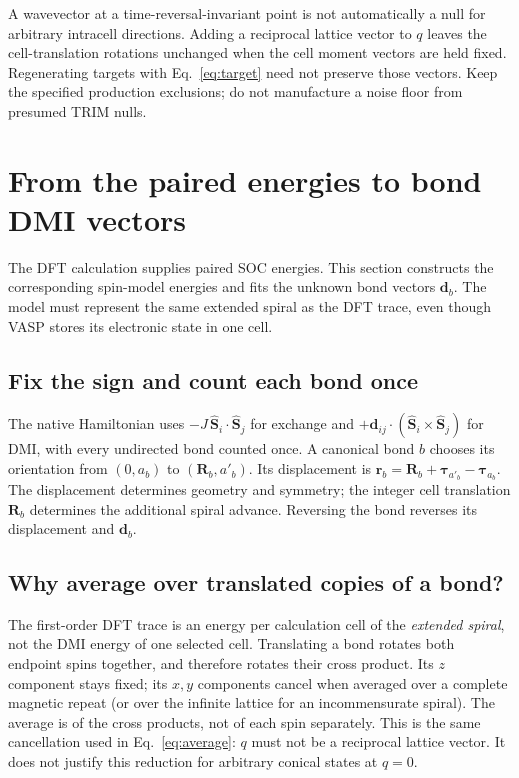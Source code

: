 \documentclass[11pt,a4paper]{article}
\numberwithin{equation}{section}
\newcommand{\vct}[1]{\bm{#1}}
\begin{document}
A wavevector at a time-reversal-invariant point is not automatically a
null for arbitrary intracell directions. Adding a reciprocal lattice vector to $q$ leaves the
cell-translation rotations unchanged when the cell moment vectors are
held fixed. Regenerating targets with Eq.~\eqref{eq:target} need not
preserve those vectors.
Keep the specified production exclusions; do not manufacture a noise floor
from presumed TRIM nulls.

\section{From the paired energies to bond DMI vectors}\label{sec:model}

The DFT calculation supplies paired SOC energies. This section constructs
the corresponding spin-model energies and fits the unknown bond vectors
$\vct d_b$. The model must represent the same extended spiral as the
DFT trace, even though VASP stores its electronic state in one cell.

\subsection{Fix the sign and count each bond once}

The native Hamiltonian uses $-J\,\hat{\vct S}_i\cdot\hat{\vct S}_j$
for exchange and $+\vct d_{ij}\cdot(\hat{\vct S}_i\times\hat{\vct S}_j)$
for DMI, with every undirected bond counted once. A canonical bond $b$
chooses its orientation from $(0,a_b)$ to $(\vct R_b,a'_b)$.
Its displacement is
$\vct r_b=\vct R_b+\vct\tau_{a'_b}-\vct\tau_{a_b}$.
The displacement determines geometry and symmetry; the integer cell
translation $\vct R_b$ determines the additional spiral advance.
Reversing the bond reverses its displacement and $\vct d_b$.

\subsection{Why average over translated copies of a bond?}

The first-order DFT trace is an energy per calculation cell of the
\emph{extended spiral}, not the DMI energy of one selected cell.
Translating a bond rotates both endpoint spins together, and therefore
rotates their cross product. Its $z$ component stays fixed; its $x,y$
components cancel when averaged over a complete magnetic repeat
(or over the infinite lattice for an incommensurate spiral).
The average is of the cross products, not of each spin separately.
This is the same cancellation used in
Eq.~\eqref{eq:average}: $q$ must not be a reciprocal lattice vector.
It does not justify this reduction for arbitrary conical states at $q=0$.
\end{document}
